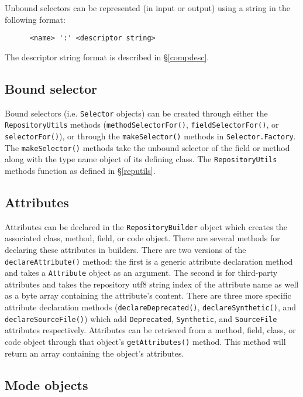 \documentclass{report}
\begin{document}
Unbound selectors can be represented (in input or output) using a string 
in the following format:
\begin{verbatim}
      <name> ':' <descriptor string>
\end{verbatim}
\noindent The descriptor string format is described in \S \ref{compdesc}.

\subsection{Bound selector}

Bound selectors (i.e. \texttt{Se\-lec\-tor} objects) can be created through
either the \texttt{Re\-pos\-i\-tory\-Utils} methods 
(\texttt{meth\-od\-Se\-lec\-tor\-For()}, \texttt{field\-Se\-lec\-tor\-For()}, 
or \texttt{selectorFor()}), or through the \texttt{makeSelector()} methods 
in \texttt{Se\-lec\-tor.Fac\-tory}. The \texttt{makeSelector()} methods take 
the unbound selector of the field or method along with the type name object of
its defining class. The \texttt{Re\-pos\-i\-tory\-Utils} methods function as 
defined in \S \ref{reputils}.

\subsection{Attributes}

Attributes can be declared in the \texttt{RepositoryBuilder} object which
creates the associated class, method, field, or code object. There are
several methods for declaring these attributes in builders. There are
two versions of the \texttt{declareAttribute()} method: the first is a
generic attribute declaration method and takes a \texttt{Attribute}
object as an argument. The second is for third-party attributes and takes
the repository utf8 string index of the attribute name as well as a byte
array containing the attribute's content. There are three more specific
attribute declaration methods (\texttt{declareDeprecated()}, 
\texttt{de\-clare\-Syn\-thet\-ic()}, and \texttt{declareSourceFile()}) which
add \texttt{Deprecated}, \texttt{Syn\-thet\-ic}, and \texttt{SourceFile}
attributes respectively. Attributes can be retrieved from a method, field,
class, or code object through that object's \texttt{getAttributes()} method.
This method will return an array containing the object's attributes.

\subsection{Mode objects}
\end{document}
